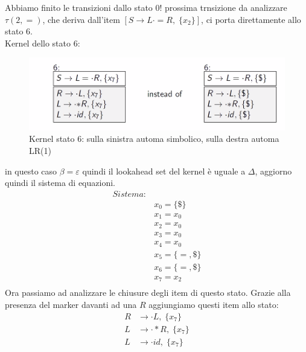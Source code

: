 \documentclass[class=book, crop=false, oneside, 12pt]{standalone}
\begin{document}
Abbiamo finito le transizioni dallo stato 0! prossima trnsizione da analizzare \(\tau(2, =)\), che deriva dall'item \([S \to L \cdot = R, \; \{x_2\}]\), ci porta direttamente allo stato 6.
\\
Kernel dello stato 6:
\begin{figure}
    \centering
    \includegraphics[width=.7\textwidth]{ex_automa_simbolico-kernel_s6.png}
    \caption{Kernel stato 6: sulla sinistra automa simbolico, sulla destra automa LR(1)}
\end{figure}
in questo caso  \(\beta = \varepsilon\) quindi il lookahead set del kernel è uguale a \(\Delta\), aggiorno quindi il sistema di equazioni.
\begin{align*}
    Sistema:& \\
            & x_0 = \{\$\} \\
            & x_1 = x_0 \\
            & x_2 = x_0 \\
            & x_3 = x_0 \\
            & x_4 = x_0 \\
            & x_5 = \{=, \$\} \\
            & x_6 = \{=, \$\} \\
            & x_7 = x_2 \\
\end{align*}
Ora passiamo ad analizzare le chiusure degli item di questo stato.
Grazie alla presenza del marker davanti ad una \(R\) aggiungiamo questi item allo stato:
\begin{align*}
    R &\to \cdot L, \; \{x_7\} \\
    L &\to \cdot *R, \; \{x_7\} \\
    L &\to \cdot id, \; \{x_7\}
\end{align*}
\end{document}
